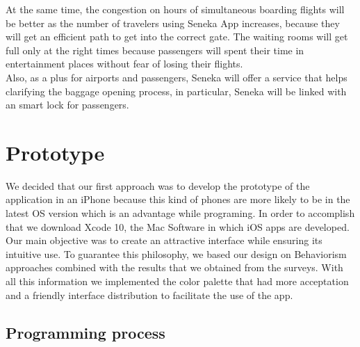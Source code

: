 \documentclass[12pt]{article}
\begin{document}
At the same time, the congestion on hours of simultaneous boarding flights will be better as the number of travelers using Seneka App increases, because they will get an efficient path to get into the correct gate. The waiting rooms will get full only at the right times because passengers will spent their time in entertainment places without fear of losing their flights.\\

Also, as a plus for airports and passengers, Seneka will offer a service that helps clarifying the baggage opening process, in particular, Seneka will be linked with an smart lock for passengers.\\  

\section{Prototype}

We decided that our first approach was to develop the prototype of the application in an iPhone because this kind of phones are more likely to be in the latest OS version which is an advantage while programing. In order to accomplish that we download Xcode 10, the Mac Software in which iOS apps are developed. Our main objective was to create an attractive interface while ensuring its intuitive use. To guarantee this philosophy, we based our design on Behaviorism approaches combined with the results that we obtained from the surveys. With all this information we implemented the color palette that had more acceptation and a friendly interface distribution to facilitate the use of the app. \\

\subsection{Programming process}
\end{document}
